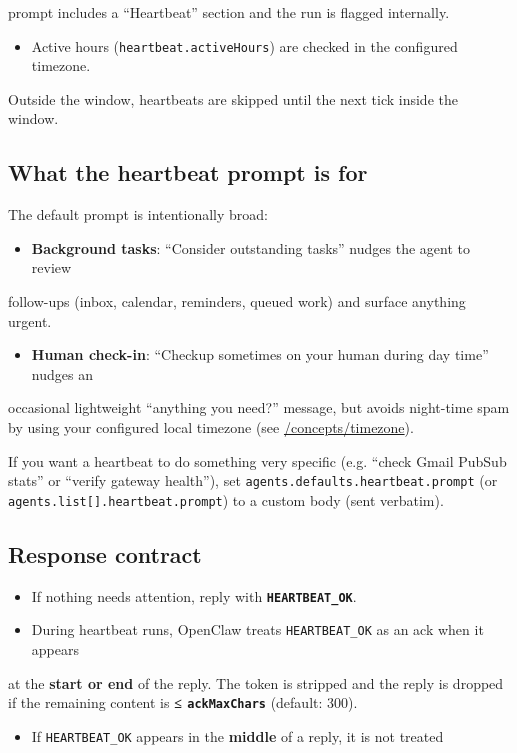 prompt includes a “Heartbeat” section and the run is flagged internally.
\begin{itemize}
  \item Active hours (\texttt{heartbeat.activeHours}) are checked in the configured timezone.
\end{itemize}

Outside the window, heartbeats are skipped until the next tick inside the window.

\subsection{What the heartbeat prompt is for}


The default prompt is intentionally broad:

\begin{itemize}
  \item \textbf{Background tasks}: “Consider outstanding tasks” nudges the agent to review
\end{itemize}

follow-ups (inbox, calendar, reminders, queued work) and surface anything urgent.
\begin{itemize}
  \item \textbf{Human check-in}: “Checkup sometimes on your human during day time” nudges an
\end{itemize}

occasional lightweight “anything you need?” message, but avoids night-time spam
by using your configured local timezone (see \href{/concepts/timezone}{/concepts/timezone}).

If you want a heartbeat to do something very specific (e.g. “check Gmail PubSub
stats” or “verify gateway health”), set \texttt{agents.defaults.heartbeat.prompt} (or
\texttt{agents.list[].heartbeat.prompt}) to a custom body (sent verbatim).

\subsection{Response contract}


\begin{itemize}
  \item If nothing needs attention, reply with \textbf{\texttt{HEARTBEAT\_OK}}.
  \item During heartbeat runs, OpenClaw treats \texttt{HEARTBEAT\_OK} as an ack when it appears
\end{itemize}

at the \textbf{start or end} of the reply. The token is stripped and the reply is
dropped if the remaining content is \textbf{≤ \texttt{ackMaxChars}} (default: 300).
\begin{itemize}
  \item If \texttt{HEARTBEAT\_OK} appears in the \textbf{middle} of a reply, it is not treated
\end{itemize}

